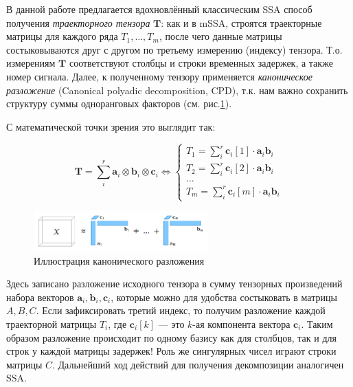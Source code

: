 			 В данной работе предлагается вдохновлённый классическим SSA способ получения \textit{траекторного тензора} $ \mathbf{T} $: как и в mSSA, строятся траекторные матрицы для каждого ряда $ T_1, \ldots, T_m $, после чего данные матрицы состыковываются друг с другом по третьему измерению (индексу) тензора. Т.о. измерениям $ \mathbf{T} $ соответствуют столбцы и строки временных задержек, а также номер сигнала. Далее, к полученному тензору применяется \textit{каноническое разложение} (Canonical polyadic decomposition, CPD), т.к. нам важно сохранить структуру суммы одноранговых факторов (см. рис.\ref{pic:cpu_dec}).
			 
			 С математической точки зрения это выглядит так:
			 
			 \begin{equation}\label{eq:tSSA_decomp}
			 	\mathbf{T} = \sum\limits_i^{r} \mathbf{a}_i \otimes \mathbf{b}_i \otimes \mathbf{c}_i \Leftrightarrow \begin{cases}
			 		T_1 = \sum\limits_i^{r} \mathbf{c}_i[1] \cdot \mathbf{a}_i  \mathbf{b}_i  \\
			 		T_2 = \sum\limits_i^{r} \mathbf{c}_i[2] \cdot \mathbf{a}_i  \mathbf{b}_i \\
			 		\ldots \\
			 		T_m = \sum\limits_i^{r} \mathbf{c}_i[m] \cdot \mathbf{a}_i  \mathbf{b}_i 
			 	\end{cases}
			 \end{equation}
			 
			 \begin{figure}[h]
			 	\centering
			 	\includegraphics[width=0.6\textwidth, keepaspectratio]{../figs/cpu_decomp}
			 	\caption{Иллюстрация канонического разложения}\label{pic:cpu_dec}
			 \end{figure}
			 
			 Здесь записано разложение исходного тензора в сумму тензорных произведений набора векторов $ \mathbf{a}_i, \mathbf{b}_i, \mathbf{c}_i $, которые можно для удобства состыковать в матрицы $ A, B, C $. Если зафиксировать третий индекс, то получим разложение каждой траекторной матрицы $ T_i $, где $ \mathbf{c}_i[k] $ --- это $ k $-ая компонента вектора $ \mathbf{c}_i $. Таким образом разложение происходит по одному базису как для столбцов, так и для строк у каждой матрицы задержек! Роль же сингулярных чисел играют строки матрицы $ C $. Дальнейший ход действий для получения декомпозиции аналогичен SSA.
			 
